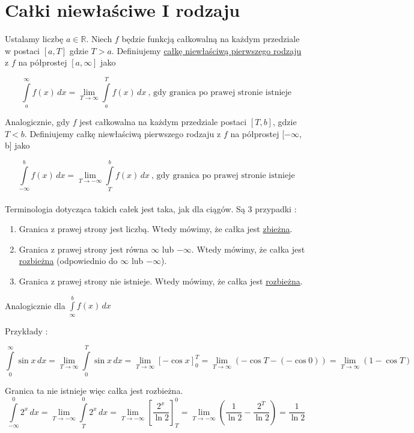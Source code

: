 \section{Całki niewłaściwe I rodzaju}

Ustalamy liczbę $a \in \mathbb{R}$. Niech $f$ będzie funkcją całkowalną na każdym przedziale \linebreak w postaci $[a, T]$
gdzie $T > a$. Definiujemy \underline{całkę niewłaściwą pierwszego rodzaju} z $f$ na półprostej $[a, \infty]$ jako

$$ \int\limits_{a}^{\infty} f(x) \,dx = \lim_{T \to \infty} \int\limits_{a}^{T} f(x) \,dx \ \text{,  gdy granica po prawej stronie istnieje} $$

Analogicznie, gdy $f$ jest całkowalna na każdym przedziale postaci $[T, b]$, gdzie $T < b$. Definiujemy całkę niewłaściwą
pierwszego rodzaju z $f$ na półprostej [$-\infty$, b] jako

$$ \int\limits_{-\infty}^{b} f(x) \,dx = \lim_{T \to -\infty} \int\limits_{T}^{b} f(x) \,dx \ \text{,  gdy granica po prawej stronie istnieje} $$\\

Terminologia dotycząca takich całek jest taka, jak dla ciągów. Są 3 przypadki :

\begin{enumerate}
    \item Granica z prawej strony jest liczbą. Wtedy mówimy, że całka jest \underline{zbieżna}.
    \item Granica z prawej strony jest równa $\infty$ lub $-\infty$. Wtedy mówimy, że całka jest \underline{rozbieżna} (odpowiednio do $\infty$ lub $-\infty$).
    \item Granica z prawej strony nie istnieje. Wtedy mówimy, że całka jest \underline{rozbieżna}.
\end{enumerate}

Analogicznie dla $ \int\limits_{\infty}^{b} f(x)\,dx $

Przykłady :

$$ \int\limits_{0}^{\infty} \sin x \,dx = \lim_{T \to \infty} \int\limits_{0}^{T} \sin x \,dx = 
\lim_{T \to \infty} [-\cos x]_0^T = \lim_{T \to \infty} (-\cos T - (- \cos 0)) = \lim_{T \to \infty} (1 - \cos T) $$

Granica ta nie istnieje więc całka jest rozbieżna. \\

$$ \int\limits_{-\infty}^{0} 2^x \,dx = \lim_{T \to -\infty} \int\limits_{T}^{0} 2^x \,dx = 
\lim_{T \to -\infty} \left[ \frac{2^x}{\ln 2} \right]_T^0 = \lim_{T \to -\infty} 
\left( \frac{1}{\ln 2} - \frac{2^T}{\ln 2} \right) = \frac{1}{\ln 2} $$

